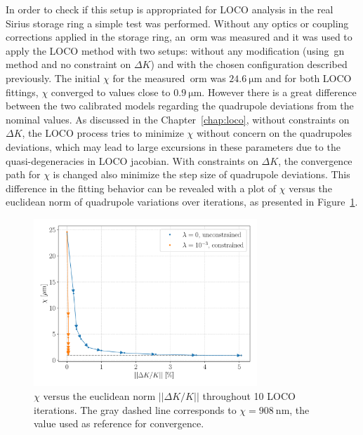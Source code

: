 In order to check if this setup is appropriated for LOCO analysis in the real Sirius storage ring a simple test was performed. Without any optics or coupling corrections applied in the storage ring, an~\gls{orm} was measured and it was used to apply the LOCO method with two setups: without any modification (using~\gls{gn} method and no constraint on $\Delta K$) and with the chosen configuration described previously. The initial $\chi$ for the measured~\gls{orm} was $\SI{24.6}{\micro\meter}$ and for both LOCO fittings, $\chi$ converged to values close to $\SI{0.9}{\micro\meter}$. However there is a great difference between the two calibrated models regarding the quadrupole deviations from the nominal values. As discussed in the Chapter~\ref{chap:loco}, without constraints on $\Delta K$, the LOCO process tries to minimize $\chi$ without concern on the quadrupoles deviations, which may lead to large excursions in these parameters due to the quasi-degeneracies in LOCO jacobian. With constraints on $\Delta K$, the convergence path for $\chi$ is changed also minimize the step size of quadrupole deviations. This difference in the fitting behavior can be revealed with a plot of $\chi$ versus the euclidean norm of quadrupole variations over iterations, as presented in Figure~\ref{fig:chi_vs_dkl}.
\begin{figure}
\centering
\includegraphics[width=0.75\textwidth]{figures/chi_versus_dk_grid.pdf}
\caption{$\chi$ versus the euclidean norm $||\Delta K/K||$ throughout 10 LOCO iterations. The gray dashed line corresponds to $\chi = \SI{908}{\nano\meter}$, the value used as reference for convergence.}
\label{fig:chi_vs_dkl}
\end{figure}

